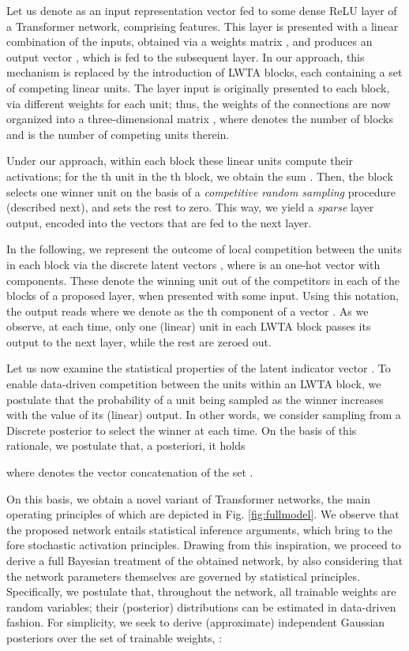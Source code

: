 \documentclass[10pt,twocolumn,letterpaper]{article}
\begin{document}
Let us denote as  an input representation vector fed to some dense ReLU layer of a Transformer network, comprising  features. This layer is presented with a linear combination of the inputs, obtained via a weights matrix , and produces an output vector , which is fed to the subsequent layer. In our approach, this mechanism is replaced by the introduction of LWTA blocks, each containing a set of competing linear units. The layer input is originally presented to each block, via different weights for each unit; thus, the weights of the connections are now organized into a three-dimensional matrix , where  denotes the number of blocks and  is the number of competing units therein.

Under our approach, within each block these linear units compute their activations; for the th unit in the th block, we obtain the sum
. Then, the block selects one winner unit on the basis of a \emph{competitive random sampling} procedure (described next), and sets the rest to zero. This way, we yield a \emph{sparse} layer output, encoded into the vectors  that are fed to the next layer. 

In the following, we represent the outcome of local competition between the units in each block via the discrete latent vectors , where  is an one-hot vector with  components. These denote the winning unit out of the  competitors in each of the  blocks of a proposed layer, when presented with some input. Using this notation, the output reads
 where we denote as  the th component of a vector . As we observe, at each time, only one (linear) unit in each LWTA block passes its output to the next layer, while the rest are zeroed out.

Let us now examine the statistical properties of the latent indicator vector . To enable data-driven competition between the units within an LWTA block, we postulate that the probability of a unit being sampled as the winner increases with the value of its (linear) output. In other words, we consider sampling from a Discrete posterior to select the winner at each time. On the basis of this rationale, we postulate that, a posteriori, it holds



where  denotes the vector concatenation of the set .

On this basis, we obtain a novel variant of Transformer networks, the main operating principles of which  are depicted in Fig. \ref{fig:fullmodel}. We observe that the proposed network entails statistical inference arguments, which bring to the fore stochastic activation principles. Drawing from this inspiration, we proceed to derive a full Bayesian treatment of the obtained network, by also considering that the network parameters themselves are governed by statistical principles. Specifically, we postulate that, throughout the network, all trainable weights are random variables; their (posterior) distributions can be estimated in data-driven fashion. For simplicity, we seek to derive (approximate) independent Gaussian posteriors over the set of trainable weights, :
\end{document}
